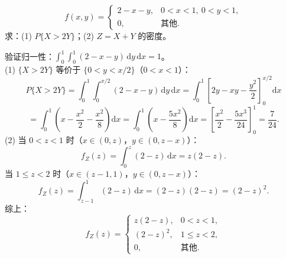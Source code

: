 ﻿\documentclass[lang=cn,11pt]{elegantbook}
\begin{document}
\begin{exercise}[三角形均匀分布求概率] \label{exer:3-c14}
\[f(x,y) = \begin{cases} 2-x-y, & 0 < x < 1,\ 0 < y < 1, \\ 0, & \text{其他}. \end{cases}\]
求：(1) $P\{X > 2Y\}$；(2) $Z = X+Y$ 的密度。
\end{exercise}
\begin{solution}
验证归一性：$\int_0^1\int_0^1(2-x-y)\,\mathrm{d}y\,\mathrm{d}x = 1$。\\
(1) $\{X > 2Y\}$ 等价于 $\{0 < y < x/2\}$（$0 < x < 1$）：
\[
P\{X > 2Y\} = \int_0^1\int_0^{x/2}(2-x-y)\,\mathrm{d}y\,\mathrm{d}x = \int_0^1\left[2y-xy-\frac{y^2}{2}\right]_0^{x/2}\mathrm{d}x
\]
\[
= \int_0^1\left(x - \frac{x^2}{2} - \frac{x^2}{8}\right)\mathrm{d}x = \int_0^1\left(x - \frac{5x^2}{8}\right)\mathrm{d}x = \left[\frac{x^2}{2} - \frac{5x^3}{24}\right]_0^1 = \frac{7}{24}.
\]
(2) 当 $0 < z < 1$ 时（$x \in (0,z)$，$y \in (0, z-x)$）：
\[
f_Z(z) = \int_0^z(2-z)\,\mathrm{d}x = z(2-z).
\]
当 $1 \leqslant z < 2$ 时（$x \in (z-1, 1)$，$y \in (0, z-x)$）：
\[
f_Z(z) = \int_{z-1}^1(2-z)\,\mathrm{d}x = (2-z)(2-z) = (2-z)^2.
\]
综上：
\[
f_Z(z) = \begin{cases} z(2-z), & 0 < z < 1, \\ (2-z)^2, & 1 \leqslant z < 2, \\ 0, & \text{其他}. \end{cases}
\]
\end{solution}
\end{document}
